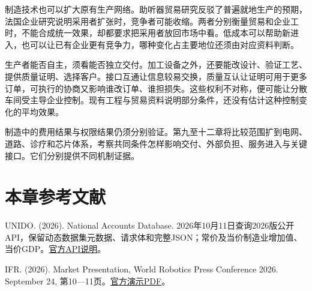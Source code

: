 \documentclass[UTF8,fontset=windows,12pt,a4paper,oneside,openany]{ctexbook}
\begin{document}
制造技术也可以扩大原有生产网络。助听器贸易研究反驳了普遍就地生产的预期，法国企业研究说明采用者扩张时，竞争者可能收缩。两者分别衡量贸易和企业工时，不能合成统一效果，却都要求把采用者放回市场中看。低成本可以帮助新进入，也可以让已有企业更有竞争力，哪种变化占主要地位还须由对应资料判断。

生产者能否自主，须看能否独立交付。加工设备之外，还要能改设计、验证工艺、提供质量证明、选择客户。接口互通让信息较易交换，质量互认让证明可用于更多订单，可执行的协商又影响谁改订单、谁担损失。这些权利不对称，便可能让分散车间受主导企业控制。现有工程与贸易资料说明部分条件，还没有估计这种控制变化的平均效果。

制造中的费用结果与权限结果仍须分别验证。第九至十二章将比较范围扩到电网、道路、诊疗和芯片体系，考察共同条件怎样影响交付、外部负担、服务进入与关键接口。它们分别提供不同机制证据。

\section*{本章参考文献}

UNIDO. (2026). National Accounts Database. 2026年10月11日查询2026版公开API，保留动态数据集元数据、请求体和完整JSON；常价及当价制造业增加值、当价GDP。\href{https://stat.unido.org/unido-statistics-portal-api}{官方API说明}。\par IFR. (2026). Market Presentation, World Robotics Press Conference 2026. September 24, 第10—11页。\href{https://ifr.org/downloads/press_docs/Market_Presentation_WR_Press_Conference_2026.pdf}{官方演示PDF}。
\end{document}
